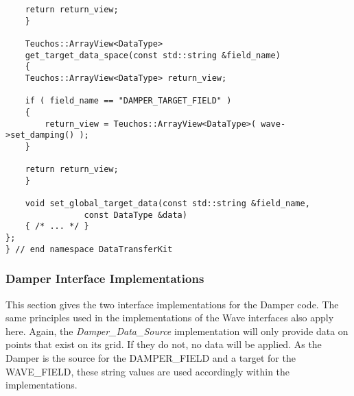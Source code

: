 \documentclass[letterpaper]{article}
\begin{document}
\begin{lstlisting}
	return return_view;
    }

    Teuchos::ArrayView<DataType> 
    get_target_data_space(const std::string &field_name)
    {
	Teuchos::ArrayView<DataType> return_view;

	if ( field_name == "DAMPER_TARGET_FIELD" )
	{
	    return_view = Teuchos::ArrayView<DataType>( wave->set_damping() );
	}

	return return_view;
    }

    void set_global_target_data(const std::string &field_name,
				const DataType &data)
    { /* ... */ }
};
} // end namespace DataTransferKit
\end{lstlisting}

\subsubsection{Damper Interface Implementations}
This section gives the two interface implementations for the Damper
code. The same principles used in the implementations of the Wave
interfaces also apply here. Again, the {\sl Damper\_Data\_Source}
implementation will only provide data on points that exist on its
grid. If they do not, no data will be applied. As the Damper is the
source for the DAMPER\_FIELD and a target for the WAVE\_FIELD, these
string values are used accordingly within the implementations.
\end{document}
